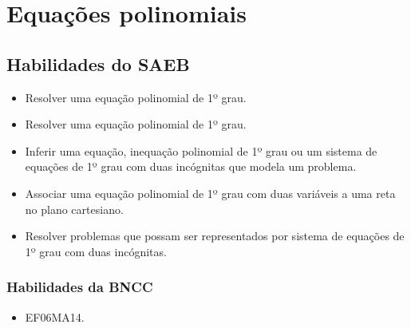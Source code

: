 
\chapter{Equações polinomiais}

\section*{Habilidades do SAEB} 
\begin{itemize}
\item Resolver uma equação polinomial de 1º grau.
\item
 Resolver uma equação polinomial de 1º grau.
\item
  Inferir uma equação, inequação polinomial de 1º grau ou um sistema de
  equações de 1º grau com duas incógnitas que modela um problema.
\item
  Associar uma equação polinomial de 1º grau com duas variáveis a uma
  reta no plano cartesiano.
\item
  Resolver problemas que possam ser representados por sistema de
  equações de 1º grau com duas incógnitas.
\end{itemize}

\subsection{Habilidades da BNCC}
\begin{itemize} 
\item  EF06MA14.
\end{itemize}

